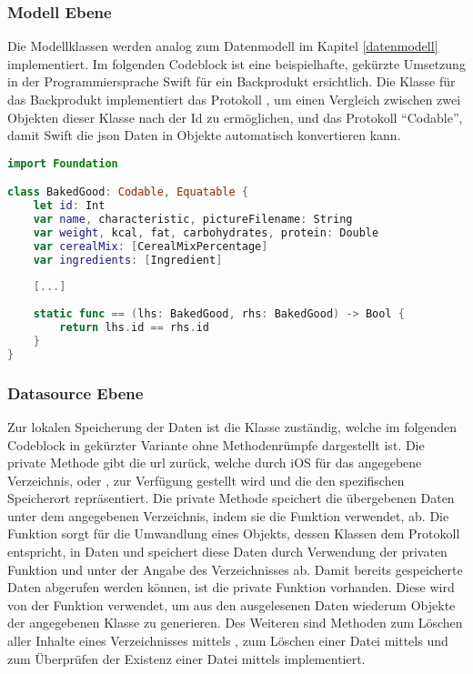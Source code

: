 \subsubsection{Modell Ebene}
Die Modellklassen werden analog zum Datenmodell im Kapitel \ref{datenmodell} implementiert.
Im folgenden Codeblock ist eine beispielhafte, gekürzte Umsetzung in der Programmiersprache Swift für ein Backprodukt ersichtlich.
Die Klasse für das Backprodukt implementiert das Protokoll , um einen Vergleich zwischen zwei Objekten dieser Klasse nach der Id zu ermöglichen, und das Protokoll  \enquote{Codable}, damit Swift die \gls{json} Daten in Objekte automatisch konvertieren kann.
\begin{lstlisting}[language=Swift]
import Foundation

class BakedGood: Codable, Equatable {
    let id: Int
    var name, characteristic, pictureFilename: String
    var weight, kcal, fat, carbohydrates, protein: Double
    var cerealMix: [CerealMixPercentage]
    var ingredients: [Ingredient]
    
    [...]
    
    static func == (lhs: BakedGood, rhs: BakedGood) -> Bool {
        return lhs.id == rhs.id
    }
}
\end{lstlisting}

\clearpage

\subsubsection{Datasource Ebene}
Zur lokalen Speicherung der Daten ist die Klasse  zuständig, welche im folgenden Codeblock in gekürzter Variante ohne Methodenrümpfe dargestellt ist.
Die private Methode  gibt die \gls{url} zurück, welche durch iOS für das angegebene Verzeichnis,  oder , zur Verfügung gestellt wird und die den spezifischen Speicherort repräsentiert.
Die private Methode  speichert die übergebenen Daten unter dem angegebenen Verzeichnis, indem sie die Funktion  verwendet, ab.
Die Funktion   sorgt für die Umwandlung eines Objekts, dessen Klassen dem  Protokoll entspricht, in Daten und speichert diese Daten durch Verwendung der privaten Funktion  und unter der Angabe des Verzeichnisses ab.
Damit bereits gespeicherte Daten abgerufen werden können, ist die private Funktion  vorhanden. Diese wird von der Funktion  verwendet, um aus den ausgelesenen Daten wiederum Objekte der angegebenen Klasse zu generieren.
Des Weiteren sind Methoden zum Löschen aller Inhalte eines Verzeichnisses mittels , zum Löschen einer Datei mittels  und zum Überprüfen der Existenz einer Datei mittels  implementiert.

